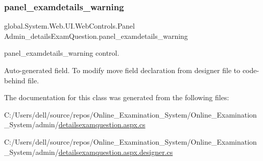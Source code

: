 \subsubsection{\texorpdfstring{panel\_examdetails\_warning}{panel\_examdetails\_warning}}
{\footnotesize\ttfamily global.\+System.\+Web.\+U\+I.\+Web\+Controls.\+Panel Admin\+\_\+details\+Exam\+Question.\+panel\+\_\+examdetails\+\_\+warning\hspace{0.3cm}{\ttfamily [protected]}}



panel\+\_\+examdetails\+\_\+warning control. 

Auto-\/generated field. To modify move field declaration from designer file to code-\/behind file. 

The documentation for this class was generated from the following files\+:\begin{DoxyCompactItemize}
\item 
C\+:/\+Users/dell/source/repos/\+Online\+\_\+\+Examination\+\_\+\+System/\+Online\+\_\+\+Examination\+\_\+\+System/admin/\mbox{\hyperlink{detailsexamquestion_8aspx_8cs}{detailsexamquestion.\+aspx.\+cs}}\item 
C\+:/\+Users/dell/source/repos/\+Online\+\_\+\+Examination\+\_\+\+System/\+Online\+\_\+\+Examination\+\_\+\+System/admin/\mbox{\hyperlink{detailsexamquestion_8aspx_8designer_8cs}{detailsexamquestion.\+aspx.\+designer.\+cs}}\end{DoxyCompactItemize}
